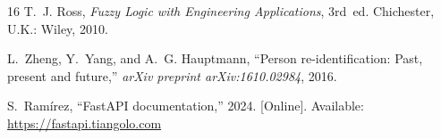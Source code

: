 \documentclass[conference]{IEEEtran}
\begin{document}
\begin{thebibliography}{16}
T.~J. Ross, \emph{Fuzzy Logic with Engineering Applications}, 3rd~ed.
Chichester, U.K.: Wiley, 2010.

L.~Zheng, Y.~Yang, and A.~G. Hauptmann, ``Person re-identification: Past,
present and future,'' \emph{arXiv preprint arXiv:1610.02984}, 2016.

S.~Ram\'irez, ``FastAPI documentation,'' 2024. [Online]. Available:
\url{https://fastapi.tiangolo.com}

\end{thebibliography}
\end{document}
